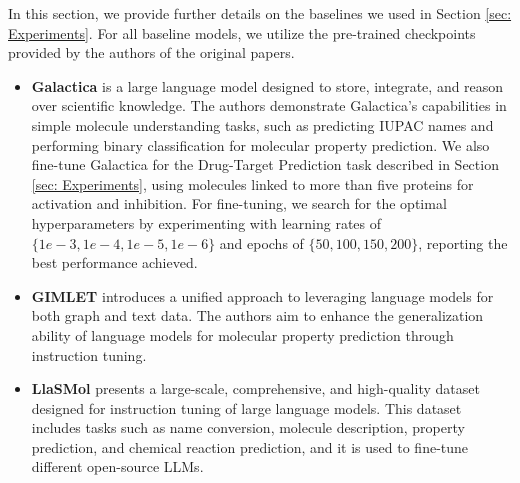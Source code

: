 In this section, we provide further details on the baselines we used in Section \ref{sec: Experiments}.
For all baseline models, we utilize the pre-trained checkpoints provided by the authors of the original papers.


\begin{itemize}[leftmargin=.1in]
\item \textbf{Galactica} \cite{taylor2022galactica} is a large language model designed to store, integrate, and reason over scientific knowledge. The authors demonstrate Galactica's capabilities in simple molecule understanding tasks, such as predicting IUPAC names and performing binary classification for molecular property prediction.
We also fine-tune Galactica for the Drug-Target Prediction task described in Section \ref{sec: Experiments}, using molecules linked to more than five proteins for activation and inhibition. 
For fine-tuning, we search for the optimal hyperparameters by experimenting with learning rates of $\{1e-3, 1e-4, 1e-5, 1e-6\}$ and epochs of $\{50, 100, 150, 200\}$, reporting the best performance achieved.

\item \textbf{GIMLET} \cite{zhao2023gimlet} introduces a unified approach to leveraging language models for both graph and text data. The authors aim to enhance the generalization ability of language models for molecular property prediction through instruction tuning.
\item \textbf{LlaSMol} \cite{yu2024llasmol} presents a large-scale, comprehensive, and high-quality dataset designed for instruction tuning of large language models. This dataset includes tasks such as name conversion, molecule description, property prediction, and chemical reaction prediction, and it is used to fine-tune different open-source LLMs.
\end{itemize}